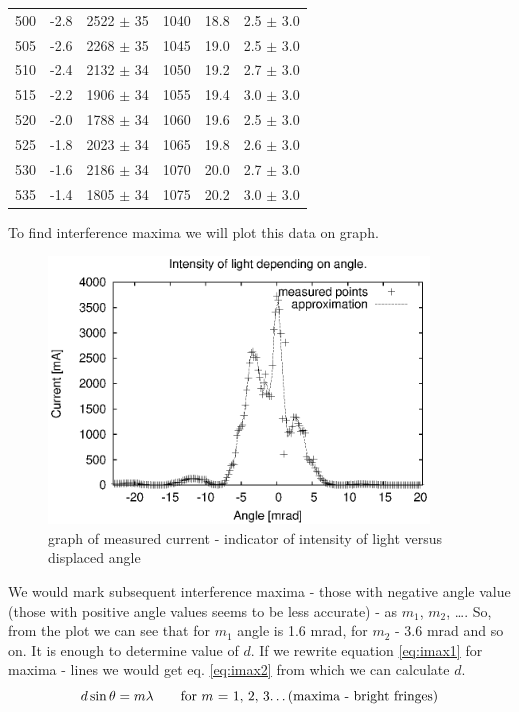 \documentclass[a4paper,12pt]{article}
\begin{document}
\begin{center}
\begin{longtable}{|c|c|c||c|c|c|}
500 & -2.8 & 2522 $\pm$  35   & 1040 & 18.8 & 2.5 $\pm$  3.0  \\
505 & -2.6 & 2268 $\pm$  35   & 1045 & 19.0 & 2.5 $\pm$  3.0  \\
510 & -2.4 & 2132 $\pm$  34   & 1050 & 19.2 & 2.7 $\pm$  3.0  \\
515 & -2.2 & 1906 $\pm$  34   & 1055 & 19.4 & 3.0 $\pm$  3.0  \\
520 & -2.0 & 1788 $\pm$  34   & 1060 & 19.6 & 2.5 $\pm$  3.0  \\
525 & -1.8 & 2023 $\pm$  34   & 1065 & 19.8 & 2.6 $\pm$  3.0  \\
530 & -1.6 & 2186 $\pm$  34   & 1070 & 20.0 & 2.7 $\pm$  3.0  \\
535 & -1.4 & 1805 $\pm$  34   & 1075 & 20.2 & 3.0 $\pm$  3.0  \\


\end{longtable}
\end{center}

To find interference maxima we will plot this data on graph. 

\begin{figure}[H]
    \begin{center}
        \includegraphics[width=0.90\textwidth]{plot}
        \caption{graph of measured current - indicator of intensity of light versus displaced angle}
        \label{fig:plot}
    \end{center}
\end{figure}

We would mark subsequent interference maxima - those with negative angle value (those with positive angle values seems to be less accurate) - as $m_1$, $m_2$, \dots. So, from the plot we can see that for $m_1$ angle is 1.6 mrad, for $m_2$ - 3.6 mrad and so on. It is enough to determine value of $d$. If we rewrite equation \ref{eq:imax1} for maxima - lines we would get eq. \ref{eq:imax2} from which we can calculate $d$.
\begin{equation}
    d \sin \theta = m \lambda \qquad \textrm{for $m$ = 1, 2, 3\dots (maxima - bright fringes)} \label{eq:imax1}
\end{equation}
\end{document}
